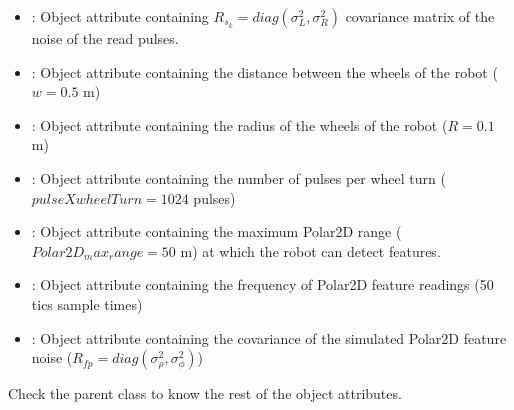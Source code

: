 \documentclass[letterpaper,10pt,english]{sphinxmanual}
\begin{document}
\begin{fulllineitems}
\begin{fulllineitems}
\begin{itemize}
\item {} 
\sphinxAtStartPar
{} : Object attribute containing \(R_{s_k}=diag(\sigma_L^2,\sigma_R^2)\) covariance matrix of the noise of the read pulses\textasciigrave{}.

\item {} 
\sphinxAtStartPar
{} : Object attribute containing the distance between the wheels of the robot (\(w=0.5\) m)

\item {} 
\sphinxAtStartPar
{} : Object attribute containing the radius of the wheels of the robot (\(R=0.1\) m)

\item {} 
\sphinxAtStartPar
{} : Object attribute containing the number of pulses per wheel turn (\(pulseXwheelTurn=1024\) pulses)

\item {} 
\sphinxAtStartPar
{} : Object attribute containing the maximum Polar2D range (\(Polar2D_max_range=50\) m) at which the robot can detect features.

\item {} 
\sphinxAtStartPar
{} : Object attribute containing the frequency of Polar2D feature readings (50 tics \sphinxhyphen{}sample times\sphinxhyphen{})

\item {} 
\sphinxAtStartPar
{} : Object attribute containing the covariance of the simulated Polar2D feature noise (\(R_{fp}=diag(\sigma_{\rho}^2,\sigma_{\phi}^2)\))

\end{itemize}

\sphinxAtStartPar
Check the parent class  to know the rest of the object attributes.

\end{fulllineitems}



\end{fulllineitems}
\end{document}
